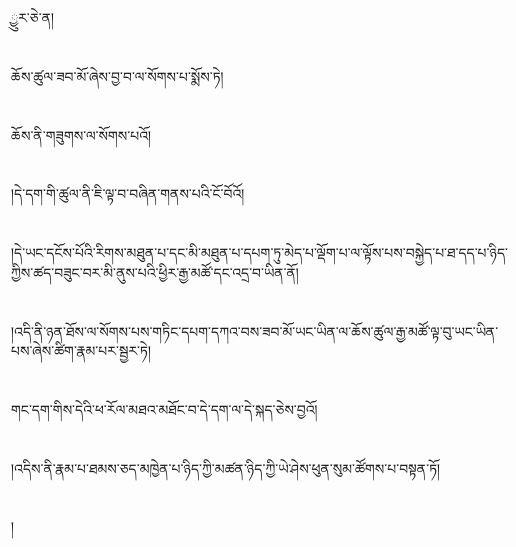 ྱུར་ཅེ་ན།\chapter{ }ཆོས་ཚུལ་ཟབ་མོ་ཞེས་བྱ་བ་ལ་སོགས་པ་སྨོས་ཏེ།\chapter{ }ཆོས་ནི་གཟུགས་ལ་སོགས་པའོ།\chapter{ }།དེ་དག་གི་ཚུལ་ནི་ཇི་ལྟ་བ་བཞིན་གནས་པའི་ངོ་བོའོ།\chapter{ }།དེ་ཡང་དངོས་པོའི་རིགས་མཐུན་པ་དང་མི་མཐུན་པ་དཔག་ཏུ་མེད་པ་ལྡོག་པ་ལ་ལྟོས་པས་བསྐྱེད་པ་ཐ་དད་པ་ཉིད་ཀྱིས་ཚད་བཟུང་བར་མི་ནུས་པའི་ཕྱིར་རྒྱ་མཚོ་དང་འདྲ་བ་ཡིན་ནོ།\chapter{ }།འདི་ནི་ཉན་ཐོས་ལ་སོགས་པས་གཏིང་དཔག་དཀའ་བས་ཟབ་མོ་ཡང་ཡིན་ལ་ཆོས་ཚུལ་རྒྱ་མཚོ་ལྟ་བུ་ཡང་ཡིན་པས་ཞེས་ཚིག་རྣམ་པར་སྦྱར་ཏེ།\chapter{ }གང་དག་གིས་དེའི་ཕ་རོལ་མཐའ་མཐོང་བ་དེ་དག་ལ་དེ་སྐད་ཅེས་བྱའོ།\chapter{ }།འདིས་ནི་རྣམ་པ་ཐམས་ཅད་མཁྱེན་པ་ཉིད་ཀྱི་མཚན་ཉིད་ཀྱི་ཡེ་ཤེས་ཕུན་སུམ་ཚོགས་པ་བསྟན་ཏོ།\chapter{ }།
